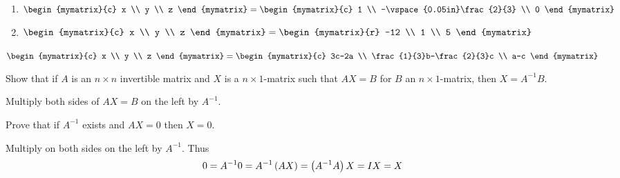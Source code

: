 \begin{enumialphparenastyle}
\begin{ex}
\begin{sol}
\begin{enumerate}
\item $\begin{mymatrix}{c}
x \\
y \\
z
\end{mymatrix} =\begin{mymatrix}{c}
1 \\
-\vspace{0.05in}\frac{2}{3} \\
0
\end{mymatrix}$
\item $\begin{mymatrix}{c}
x \\
y \\
z
\end{mymatrix} = \begin{mymatrix}{r}
-12 \\
1 \\
5
\end{mymatrix}$
\end{enumerate}

$\begin{mymatrix}{c}
x \\
y \\
z
\end{mymatrix} = 
\begin{mymatrix}{c}
3c-2a \\
\frac{1}{3}b-\frac{2}{3}c \\
a-c
\end{mymatrix}$
\end{sol}
\end{ex}

\begin{ex}Show that if $A$ is an $n\times n$ invertible matrix and $X$
is a $n\times 1$-matrix such that $AX=B$ for $B$ an 
$n\times 1$-matrix, then $X=A^{-1}B$. 
\begin{sol}
Multiply both sides of $AX=B$ on the left by $A^{-1}$.
\end{sol}
\end{ex}

\begin{ex}Prove that if $A^{-1}$ exists and $AX=0$ then $X=0$. 
\begin{sol}
Multiply on both sides on the left by $A^{-1}$. Thus
\[
0=A^{-1}0=A^{-1}\left(AX\right) =\left(
A^{-1}A\right) X=IX = X
\]
\end{sol}
\end{ex}


\end{enumialphparenastyle}
